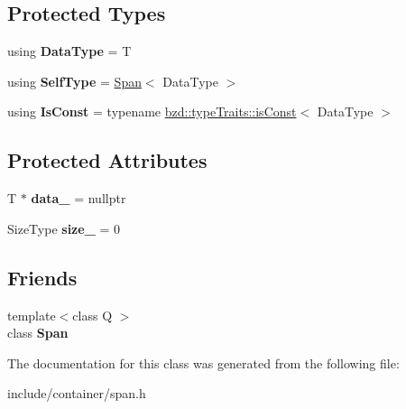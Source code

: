 \subsection*{Protected Types}
\begin{DoxyCompactItemize}
\item 
\mbox{\label{classbzd_1_1Span_ad6e7f896c2aa75a5c8d39ee1ac5f0fff}} 
using {\bfseries Data\+Type} = T
\item 
\mbox{\label{classbzd_1_1Span_a2f766718aa55276d578bdb80d2f7de99}} 
using {\bfseries Self\+Type} = \hyperlink{classbzd_1_1Span}{Span}$<$ Data\+Type $>$
\item 
\mbox{\label{classbzd_1_1Span_a77d2842477c7adccf5834b6817e7dc9c}} 
using {\bfseries Is\+Const} = typename \hyperlink{structbzd_1_1typeTraits_1_1isConst}{bzd\+::type\+Traits\+::is\+Const}$<$ Data\+Type $>$
\end{DoxyCompactItemize}
\subsection*{Protected Attributes}
\begin{DoxyCompactItemize}
\item 
\mbox{\label{classbzd_1_1Span_a6de99ffc97b145bb8f4e336ffe5b1114}} 
T $\ast$ {\bfseries data\+\_\+} = nullptr
\item 
\mbox{\label{classbzd_1_1Span_a2bb038c31c95eace73b760b69da48cec}} 
Size\+Type {\bfseries size\+\_\+} = 0
\end{DoxyCompactItemize}
\subsection*{Friends}
\begin{DoxyCompactItemize}
\item 
\mbox{\label{classbzd_1_1Span_a366eba5cfa37dd3e2ca31cdf6ae5b799}} 
{\footnotesize template$<$class Q $>$ }\\class {\bfseries Span}
\end{DoxyCompactItemize}


The documentation for this class was generated from the following file\+:\begin{DoxyCompactItemize}
\item 
include/container/span.\+h\end{DoxyCompactItemize}
